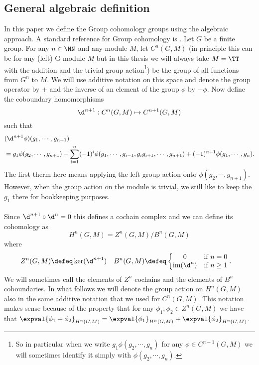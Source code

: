 \subsection{General algebraic definition}\label{sec:general-algebraic-definition}
In this paper we define the Group cohomology groups using the algebraic approach. A standard reference for Group cohomology is \cite{benson1991representations}. Let $G$ be a finite group. For any $n\in\NN$ and any module $M$, let $C^n(G,M)$ (in principle this can be for any (left) G-module $M$ but in this thesis we will always take $M=\TT$ with the addition and the trivial group action\footnote{So in particular when we write $g_1 \phi(g_2,\cdots,g_n)$ for any $\phi\in C^{n-1}(G,M)$ we will sometimes identify it simply with $\phi(g_2,\cdots,g_n)$.}) be the group of all functions from $G^n$ to $M$. We will use additive notation on this space and denote the group operator by $+$ and the inverse of an element of the group $\phi$ by $-\phi$. Now define the coboundary homomorphisms
\begin{equation}
\d^{n+1}:C^n(G,M)\mapsto C^{n+1}(G,M)
\end{equation}
such that
\begin{align}
&(\d^{n+1}\phi)(g_1,\cdots,g_{n+1})\\
\nonumber
&=g_1\phi(g_2,\cdots,g_{n+1})+\sum_{i=1}^n (-1)^i \phi(g_1,\cdots,g_{i-1},g_{i}g_{i+1},\cdots,g_{n+1})+(-1)^{n+1}\phi(g_1,\cdots,g_n).
\end{align}
The first therm here means applying the left group action onto $\phi(g_2,\cdots,g_{n+1})$. However, when the group action on the module is trivial, we still like to keep the $g_1$ there for bookkeeping purposes.\\\\
Since $\d^{n+1}\circ\d^{n}=0$ this defines a cochain complex and we can define its cohomology as
\begin{equation}
H^n(G,M)=Z^n(G,M)/B^n(G,M)
\end{equation}
where
\begin{align}
Z^n(G,M)&\defeq \ker(\d^{n+1})&B^n(G,M)&\defeq \left\{\begin{matrix}
0&\text{if }n=0\\\textrm{im}(\d^n)&\text{if }n\geq 1
\end{matrix}\right. .
\end{align}
We will sometimes call the elements of $Z^n$ cochains and the elements of $B^n$ coboundaries. In what follows we will denote the group action on $H^n(G,M)$ also in the same additive notation that we used for $C^n(G,M)$. This notation makes sense because of the property that for any $\phi_1,\phi_2\in Z^n(G,M)$ we have that $\expval{\phi_1+\phi_2}_{H^n(G,M)}=\expval{\phi_1}_{H^n(G,M)}+\expval{\phi_2}_{H^n(G,M)}$.
